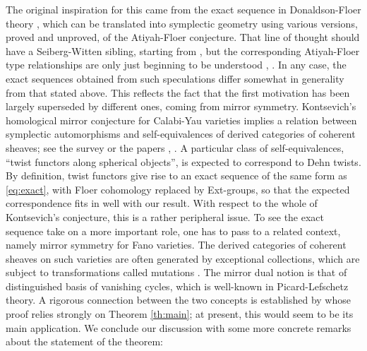 \documentclass[10pt,letterpaper]{article}
\begin{document}
The original inspiration for this came from the exact sequence in
Donaldson-Floer theory \cite{braam-donaldson94}, which can be translated into
symplectic geometry using various versions, proved \cite{dostoglou-salamon94}
and unproved, of the Atiyah-Floer conjecture. That line of thought should have
a Seiberg-Witten sibling, starting from \cite{carey-marcolli-wang98}, but the
corresponding Atiyah-Floer type relationships are only just beginning to be
understood \cite{salamon00}, \cite{ozsvath-szabo01}. In any case, the exact
sequences obtained from such speculations differ somewhat in generality from
that stated above. This reflects the fact that the first motivation has been
largely superseded by different ones, coming from mirror symmetry. Kontsevich's
homological mirror conjecture \cite{kontsevich94} for Calabi-Yau varieties
implies a relation between symplectic automorphisms and self-equivalences of
derived categories of coherent sheaves; see the survey \cite{aspinwall01} or
the papers \cite{seidel-thomas99}, \cite{horja01}. A particular class of
self-equivalences, ``twist functors along spherical objects'', is expected to
correspond to Dehn twists. By definition, twist functors give rise to an exact
sequence of the same form as \eqref{eq:exact}, with Floer cohomology replaced
by Ext-groups, so that the expected correspondence fits in well with our
result. With respect to the whole of Kontsevich's conjecture, this is a rather
peripheral issue. To see the exact sequence take on a more important role, one
has to pass to a related context, namely mirror symmetry for Fano varieties.
The derived categories of coherent sheaves on such varieties are often
generated by exceptional collections, which are subject to transformations
called mutations \cite{rudakov90}. The mirror dual notion is that of
distinguished basis of vanishing cycles, which is well-known in
Picard-Lefschetz theory. A rigorous connection between the two concepts is
established by \cite[Theorem 3.3]{seidel00} whose proof relies strongly on
Theorem \ref{th:main}; at present, this would seem to be its main application.
We conclude our discussion with some more concrete remarks about the statement
of the theorem:
\end{document}
